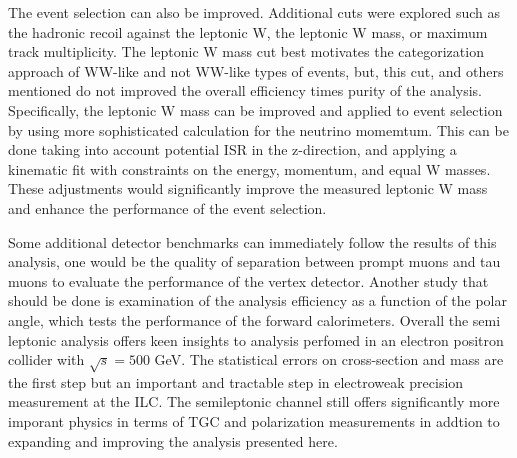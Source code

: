 The event selection can also be improved. Additional cuts were explored such as the hadronic recoil against the leptonic W, the leptonic W mass, or maximum track multiplicity. The leptonic W mass cut best motivates the categorization approach of WW-like and not WW-like types of events, but, this cut, and others mentioned do not improved the overall efficiency times purity of the analysis.  Specifically, the leptonic W mass can be improved and applied to event selection by using more sophisticated calculation for the neutrino momemtum. This can be done taking into account potential ISR in the z-direction, and applying a kinematic fit with constraints on the energy, momentum, and equal W masses. These adjustments would significantly improve the measured leptonic W mass and enhance the performance of the event selection. 
 
Some additional detector benchmarks can immediately follow the results of this analysis, one would be the quality of separation between prompt muons and tau muons to evaluate the performance of the vertex detector. Another study that should be done is examination of the analysis efficiency as a function of the polar angle, which tests the performance of the forward calorimeters.  Overall the semi leptonic analysis offers keen insights to analysis perfomed in an electron positron collider with $\sqrt{s} = 500$ GeV. The statistical errors on cross-section and mass are the first step but an important and tractable step in electroweak precision measurement at the ILC.  The semileptonic channel still offers significantly more imporant physics in terms of TGC and polarization measurements in addtion to expanding and improving the analysis presented here. 